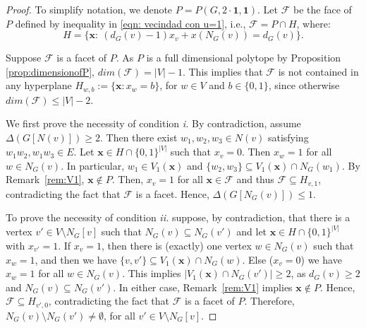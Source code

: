 \documentclass[10pt,a4paper]{amsart}
\renewcommand{\geq}{\geqslant}
\renewcommand{\leq}{\leqslant}
\begin{document}
\begin{proof}
    To simplify notation, we denote $P=P(G,2\cdot\mathbf{1},\mathbf{1})$. Let $\mathcal{F}$ be the face of $P$ defined by  inequality in \eqref{eqn: vecindad con u=1}, i.e., $\mathcal{F}=P\cap H$, where:
    \[H=\{\mathbf{x}:\ (d_G(v)-1)x_v +x(N_G(v)) = d_G(v) \}.\]

    
    Suppose $\mathcal{F}$ is a facet of $P$. As $P$ is a full dimensional polytope by Proposition \ref{prop:dimensionofP}, $dim(\mathcal{F})=|V|-1$. This implies that $\mathcal{F}$ is not contained in any hyperplane $H_{w,b}:=\{\mathbf{x}: x_w=b\}$, for $w\in V$ and $b\in\{0,1\}$, since otherwise $dim(\mathcal{F})\leq |V|-2$.
    
    We first prove the necessity of condition \textit{i.} By contradiction, assume $\Delta(G[N(v)])\geq 2$. Then there exist  $w_1,w_2,w_3\in N(v)$ satisfying 
    $w_1w_2,w_1w_3\in E$. Let $\mathbf{x}\in H\cap \{0,1\}^{|V|}$ such that $x_v=0$. Then $x_w=1$ for all $w\in N_G(v)$. In particular, $w_1\in V_1(\mathbf{x})$ and $\{w_2,w_3\}\subseteq V_1(\mathbf{x})\cap N_G(w_1)$. By Remark~\ref{rem:V1}, $\mathbf{x}\notin P$. Then, $x_v=1$ for all  $\mathbf{x}\in \mathcal{F}$ and thus $\mathcal{F}\subseteq H_{v,1}$, contradicting the fact that $\mathcal{F}$ is a facet. Hence, $\Delta(G[N_G(v)])\leq 1$.

    To prove the necessity of condition \textit{ii.} suppose, by contradiction, that there is a vertex $v'\in V\setminus N_G[v]$ such that $N_G(v)\subseteq N_G(v')$ and let $\mathbf{x}\in H\cap \{0,1\}^{|V|}$ with $x_{v'}=1$. If $x_v=1$, then there is (exactly) one vertex $w\in N_G(v)$ such that $x_w=1$, and then we have $\{v,v'\}\subseteq V_1(\mathbf{x})\cap N_G(w)$. Else ($x_v=0$) we have $x_w=1$ for all $w\in N_G(v)$. This implies $|V_1(\mathbf{x})\cap N_G(v')|\geq 2$, as $d_G(v)\geq 2$ and $N_G(v)\subseteq N_G(v')$. In either case, Remark~\ref{rem:V1} implies $\mathbf{x}\notin P$. Hence, $\mathcal{F}\subseteq H_{v', 0}$, contradicting the fact that $\mathcal{F}$ is a facet of $P$. Therefore, $N_G(v)\setminus N_G(v')\neq \emptyset$, for all $v'\in V\setminus N_G[v]$.


\end{proof}
\end{document}
